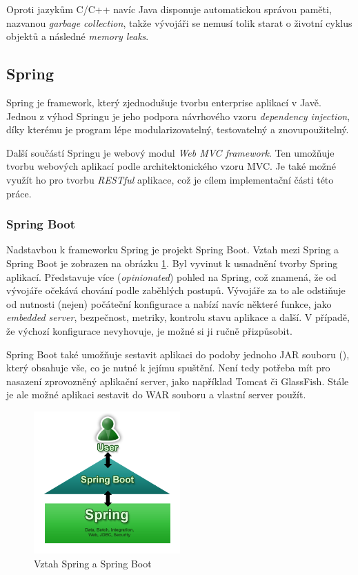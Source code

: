 \documentclass[thesis=B,czech]{FITthesis}[2012/06/26]
\begin{document}
			Oproti jazykům C/C++ navíc Java disponuje automatickou správou paměti, nazvanou \textit{garbage collection}, takže vývojáři se nemusí tolik starat o životní cyklus objektů a následné \textit{memory leaks}. \cite{what-is-java} \cite{pjv-java}
		
		\subsection{Spring}
			Spring je framework, který zjednodušuje tvorbu enterprise aplikací v Javě. \cite{spring} Jednou z výhod Springu je jeho podpora návrhového vzoru \textit{dependency injection}, díky kterému je program lépe modularizovatelný, testovatelný a znovupoužitelný.\cite{dependency-injection}
			
			Další součástí Springu je webový modul \textit{Web MVC framework}. \cite{spring-mvc-framework} Ten umožňuje tvorbu webových aplikací podle architektonického vzoru MVC. Je také možné využít ho pro tvorbu \textit{RESTful} aplikace, což je cílem implementační části této práce.
			
			\subsubsection{Spring Boot}
				Nadstavbou k frameworku Spring je projekt Spring Boot. \cite{spring-boot} Vztah mezi Spring a Spring Boot je zobrazen na obrázku \ref{pic:spring-boot}. Byl vyvinut k usnadnění tvorby Spring aplikací. Představuje více  (\textit{opinionated}) pohled na Spring, což znamená, že od vývojáře očekává  chování podle zaběhlých postupů. \cite{opinionated-software} Vývojáře za to ale odstiňuje od nutnosti (nejen) počáteční konfigurace a nabízí navíc některé funkce, jako \textit{embedded server}, bezpečnost, metriky, kontrolu stavu aplikace a další. V případě, že výchozí konfigurace nevyhovuje, je možné si ji ručně přizpůsobit. \cite{spring-boot-blog}
				
				Spring Boot také umožňuje sestavit aplikaci do podoby jednoho JAR souboru (), který obsahuje vše, co je nutné k jejímu spuštění. Není tedy potřeba mít pro nasazení zprovozněný aplikační server, jako například Tomcat či GlassFish. Stále je ale možné aplikaci sestavit do WAR souboru a vlastní server použít.
				
				\begin{figure}\centering
					\includegraphics[width=0.5\textwidth]{spring-boot.png}
					\caption[Spring Boot]{Vztah Spring a Spring Boot \cite{spring-boot-blog}}
					\label{pic:spring-boot}
				\end{figure}
				
\end{document}
